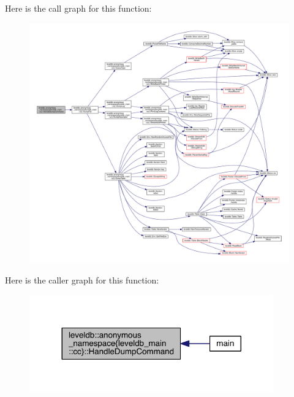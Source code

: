 Here is the call graph for this function\+:
\nopagebreak
\begin{figure}[H]
\begin{center}
\leavevmode
\includegraphics[width=350pt]{namespaceleveldb_1_1anonymous__namespace_02leveldb__main_8cc_03_afe5479ed1336c698fdce3f73115a6b33_cgraph}
\end{center}
\end{figure}




Here is the caller graph for this function\+:
\nopagebreak
\begin{figure}[H]
\begin{center}
\leavevmode
\includegraphics[width=299pt]{namespaceleveldb_1_1anonymous__namespace_02leveldb__main_8cc_03_afe5479ed1336c698fdce3f73115a6b33_icgraph}
\end{center}
\end{figure}


\hypertarget{namespaceleveldb_1_1anonymous__namespace_02leveldb__main_8cc_03_a9212c400679f75d9fb1ed7fd08611404}{}
